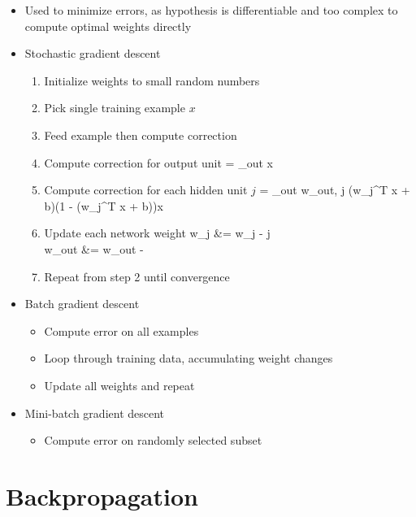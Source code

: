 \documentclass[12pt]{article}
\newenvironment{eqn}{\equation\alignedat{3}}{\endalignedat\endequation}
\begin{document}
\begin{itemize}
	\item Used to minimize errors, as hypothesis is differentiable and too complex to compute optimal weights directly 
	\item Stochastic gradient descent
	\begin{enumerate}
		\item Initialize weights to small random numbers 
		\item Pick single training example $x$
		\item Feed example then compute correction
		\item Compute correction for output unit
		\begin{eqn}
			 = \delta_{out} x
		\end{eqn}
		\item Compute correction for each hidden unit $j$ 
		\begin{eqn}
			 = \delta_{out} w_{out, j} \sigma(w_j^T x + b)(1 - \sigma(w_j^T x + b))x
		\end{eqn}
		\item Update each network weight
		\begin{eqn}
			w_j &= w_j - \alpha {} \forall j \\ 
			w_{out} &= w_{out} - \alpha {}
		\end{eqn}
		\item Repeat from step 2 until convergence
	\end{enumerate}
	\item Batch gradient descent
	\begin{itemize}
		\item Compute error on all examples 
		\item Loop through training data, accumulating weight changes 
		\item Update all weights and repeat
	\end{itemize}
	\item Mini-batch gradient descent
	\begin{itemize}
		\item Compute error on randomly selected subset
	\end{itemize}
\end{itemize}

\section{Backpropagation}
\end{document}
